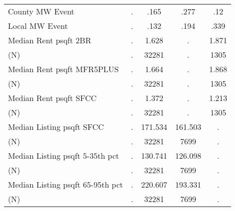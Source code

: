 \begin{tabular}{l*{4}{c}}
County MW Event&           .&        .165&        .277&         .12\\
Local MW Event&           .&        .132&        .194&        .339\\
Median Rent psqft 2BR&           .&       1.628&           .&       1.871\\
(N)         &           .&       32281&           .&        1305\\
Median Rent psqft MFR5PLUS&           .&       1.664&           .&       1.868\\
(N)         &           .&       32281&           .&        1305\\
Median Rent psqft SFCC&           .&       1.372&           .&       1.213\\
(N)         &           .&       32281&           .&        1305\\
Median Listing psqft SFCC&           .&     171.534&     161.503&           .\\
(N)         &           .&       32281&        7699&           .\\
Median Listing psqft 5-35th pct&           .&     130.741&     126.098&           .\\
(N)         &           .&       32281&        7699&           .\\
Median Listing psqft 65-95th pct&           .&     220.607&     193.331&           .\\
(N)         &           .&       32281&        7699&           .\\
\hline\hline
\end{tabular}
